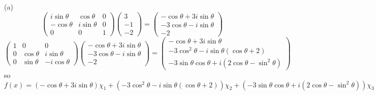 \documentclass[a4paper]{article}
\begin{document}
(a) 
\[
\begin{pmatrix}
i\sin\theta&\cos\theta&0\\
-\cos\theta&i\sin\theta&0\\
0&0&1
\end{pmatrix}
\begin{pmatrix}
3\\-1\\-2
\end{pmatrix}=
\begin{pmatrix}
-\cos\theta+3i\sin\theta\\
-3\cos\theta-i\sin\theta\\
-2
\end{pmatrix}
\]
\[
\begin{pmatrix}
1&0&0\\
0&\cos\theta&i\sin\theta\\
0&\sin\theta&-i\cos\theta
\end{pmatrix}
\begin{pmatrix}
-\cos\theta+3i\sin\theta\\
-3\cos\theta-i\sin\theta\\
-2
\end{pmatrix}=
\begin{pmatrix}
-\cos\theta+3i\sin\theta\\
-3\cos^2\theta-i\sin\theta(\cos\theta+2)\\
-3\sin\theta\cos\theta+i(2\cos\theta-\sin^2\theta)
\end{pmatrix}
\]
so
\[
f(x)=(-\cos\theta+3i\sin\theta)\chi_1+(-3\cos^2\theta-i\sin\theta(\cos\theta+2))\chi_2+(-3\sin\theta\cos\theta+i(2\cos\theta-\sin^2\theta))\chi_3
\]
\end{document}
